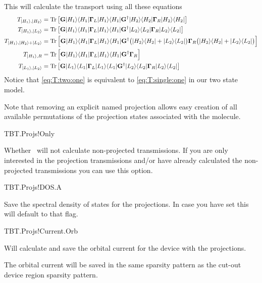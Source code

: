\bgroup
\def\bra#1{\langle#1|}
\def\ket#1{|#1\rangle}
\def\kb#1{\ket{#1}\bra{#1}}
\def\Gf{\mathbf G}
\def\Gam{\boldsymbol\Gamma}

This will calculate the transport using all these equations
\begin{align}
  \label{eq:T:proj:1}
  T_{\ket{H_1},\ket{H_2}} &=\Tr\big[\Gf\kb{H_1}\Gam_L\kb{H_1}\Gf^\dagger\kb{H_2}\Gam_R\kb{H_2}\big]
  \\
  \label{eq:T:proj:2}
  T_{\ket{H_1},\ket{L_2}} &=\Tr\big[\Gf\kb{H_1}\Gam_L\kb{H_1}\Gf^\dagger\kb{L_2}\Gam_R\kb{L_2}\big]
  \\
  \label{eq:T:two:one}
  T_{\ket{H_1},\ket{H_2}+\ket{L_2}}
  &=\Tr\Big[\Gf\kb{H_1}\Gam_L\kb{H_1}\Gf^\dagger\big(\kb{H_2}+\kb{L_2}\big)\Gam_R\big(\kb{H_2}+\kb{L_2}\big)\Big]
  \\
  \label{eq:T:single:one}
  T_{\ket{H_1},R} &=\Tr\Big[\Gf\kb{H_1}\Gam_L\kb{H_1}\Gf^\dagger\Gam_R\Big]
  \\
  \label{eq:T:proj:5}
  T_{\ket{L_1},\ket{L_2}} &=\Tr\big[\Gf\kb{L_1}\Gam_L\kb{L_1}\Gf^\dagger\kb{L_2}\Gam_R\kb{L_2}\big]
\end{align}
\egroup %
Notice that \ref{eq:T:two:one} is equivalent to \ref{eq:T:single:one}
in our two state model.

Note that removing an explicit named projection allows easy creation
of all available permutations of the projection states associated with
the molecule.


\begin{fdflogicalF}{TBT.Projs!Only}

  Whether \tbtrans\ will not calculate non-projected transmissions. If
  you are only interested in the projection transmissions and/or have
  already calculated the non-projected transmissions you can use this
  option.
  
\end{fdflogicalF}

\begin{fdflogicalF}{TBT.Projs!DOS.A}%

  Save the spectral density of states for the projections. In case you
  have set  this will default to that flag.
  
\end{fdflogicalF}

\begin{fdflogicalF}{TBT.Projs!Current.Orb}%

  Will calculate and save the orbital current for the device with the
  projections.

  The orbital current will be saved in the same sparsity pattern as
  the cut-out device region sparsity pattern. 
  
\end{fdflogicalF}

